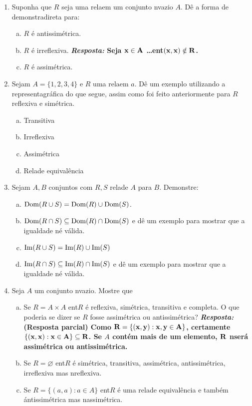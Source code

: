 \begin{enumerate}[{\bf 1.}]
\item Suponha que $R$ seja uma rela\cao em um conjunto n\ao vazio $A$. D\^e a forma de demonstra\cao direta para:
\begin{enumerate}[a)]
\item $R$ \'e antissim\'etrica.
\item $R$ \'e irreflexiva. {\bf{\it Resposta:} Seja ${\bf x\in A}$ \ldots ent\ao ${\bf (x,x)\notin R}$.}
\item $R$ \'e assim\'etrica.
\end{enumerate}

\item Sejam $A=\{1,2,3,4\}$ e $R$ uma rela\cao em $a$. D\^e um exemplo utilizando a representa\cao gr\'afica do que segue, assim como foi feito anteriormente para $R$ reflexiva e sim\'etrica.
\begin{enumerate}[a)]
\item Transitiva
\item Irreflexiva
\item Assim\'etrica
\item Rela\cao de equival\^encia
\end{enumerate}

\item Sejam $A,B$ conjuntos com $R,S$ rela\coes de $A$ para $B$. Demonstre:
\begin{enumerate}[a)]
\item $\operatorname{Dom}(R\cup S)=\operatorname{Dom}(R)\cup \operatorname{Dom}(S)$.
\item $\operatorname{Dom}(R\cap S)\subseteq \operatorname{Dom}(R)\cap \operatorname{Dom}(S)$ e d\^e um exemplo para mostrar que a igualdade n\ao \'e v\'alida.
\item $\operatorname{Im}(R\cup S)=\operatorname{Im}(R)\cup \operatorname{Im}(S)$
\item $\operatorname{Im}(R\cap S)\subseteq \operatorname{Im}(R)\cap \operatorname{Im}(S)$ e d\^e um exemplo para mostrar que a igualdade n\ao \'e v\'alida.
\end{enumerate}

\item Seja $A$ um conjunto n\ao vazio. Mostre que
\begin{enumerate}[a)]
\item Se $R=A\times A$ ent\ao $R$ \'e reflexiva, sim\'etrica, transitiva e completa. O que poderia se dizer se $R$ fosse assim\'etrica ou antissim\'etrica?  {\bf{\it Resposta:} (Resposta parcial) Como  ${\bf R=\{(x,y): x,y\in A\}}$, certamente ${\bf \{(x,x): x\in A\}\subseteq R}$. Se $A$ cont\'em mais de um elemento, ${\bf R}$ n\ao ser\'a assim\'etrica ou antissim\'etrica.}
\item Se $R=\varnothing$ ent\ao $R$ \'e sim\'etrica, transitiva, assim\'etrica, antissim\'etrica, irreflexiva mas n\ao reflexiva.
\item Se $R=\{(a,a):a\in A\}$ ent\ao $R$ \'e uma rela\cao de equival\^encia e tamb\'em \' antissim\'etrica mas n\ao assim\'etrica.
\end{enumerate}


\end{enumerate}
